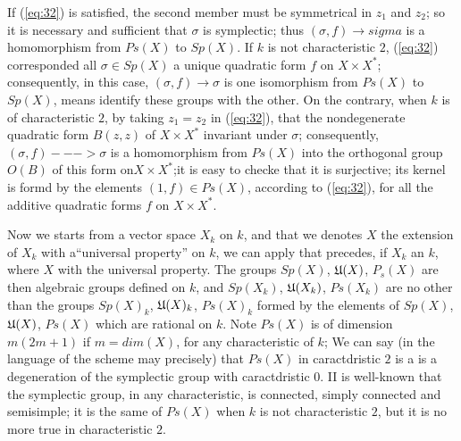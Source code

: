 \documentclass[12pt]{amsart}
\newcounter{ssection}
\renewcommand{\subsection}{
  \addtocounter{ssection}{1}{\bf  \arabic{ssection}.\  }}
\begin{document}
If (\ref{eq:32}) is satisfied, 
the second member must be symmetrical in $z_1$ and $z_2$;
so it is necessary and sufficient that $\sigma$ is symplectic;
thus $(\sigma, f)\to sigma$ is a homomorphism from $Ps(X)$ to $Sp(X)$.
If $k$ is not characteristic $2$, (\ref{eq:32}) corresponded all $\sigma \in Sp(X)$
a unique quadratic form $f$ on $X\times X^*$; 
consequently, in this case, $(\sigma,f)\to \sigma$ is one 
isomorphism from $Ps(X)$ to  $Sp(X)$,
means identify these groups with the other.
On the contrary, when $k$ is of characteristic $2$,
 by taking $z_1 =z_2$ in (\ref{eq:32}), that the nondegenerate quadratic form $B(z,z)$ 
of $X\times X^*$  invariant under $\sigma$;  consequently, $(\sigma,f)--->\sigma$ is a homomorphism from $Ps(X)$
into the orthogonal group $O(B)$ of this form on$X\times X^*$;it is easy to checke that it is 
surjective; its kernel is formd by the elements $(1,f)\in Ps (X)$, according to (\ref{eq:32}),
for all the additive quadratic forms $f$ on $X\times X^*$.

Now we starts from a vector space $X_k$ on $k$, 
and that we denotes $X$ the extension of $X_k$ with a``universal property'' on $k$,
we can apply that precedes, if $X_k$ an $k$, where 
$X$ with the universal property. The groups $Sp(X)$, ${\mathfrak{U}}(X)$, $P_s(X)$ are then algebraic groups defined on $k$, 
and $Sp(X_k)$, ${\mathfrak{U}}(X_k)$, $Ps(X_k)$ are no other than the groups 
$Sp(X)_k$, ${\mathfrak{U}}(X)_k$, $Ps(X)_k$  formed by the elements of $Sp(X)$, ${\mathfrak{U}}(X)$, 
$Ps(X)$ which are rational on $k$. 
Note $Ps(X)$ is of dimension $m(2m + 1)$ if $m =dim(X)$, for any characteristic of $k$;
We can say (in the language of the scheme may precisely) that $Ps(X)$ in 
caractdristic $2$ is a  is a degeneration of the symplectic group with caractdristic $0$. 
II is well-known that the symplectic group, in any characteristic, is connected, 
simply connected and semisimple;
it is the same of $Ps(X)$ when $k$ is not characteristic $2$, but it is no more true in characteristic $2$.

\subsection{}

\subsection{}

\setcounter{ssection}{35}
\end{document}
